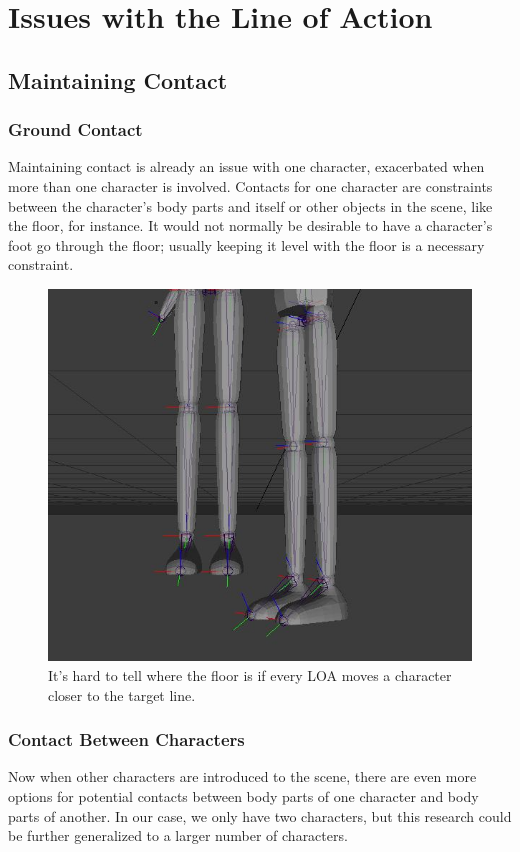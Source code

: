 \chapter{Issues with the Line of Action}\label{chap:issues}

\section{Maintaining Contact}
\subsection{Ground Contact}
Maintaining contact is already an issue with one character, exacerbated when more than one character is involved. Contacts for one character are constraints between the character's body parts and itself or other objects in the scene, like the floor, for instance. It would not normally be desirable to have a character's foot go through the floor; usually keeping it level with the floor is a necessary constraint.

\begin{figure}[!h]
\centering
\includegraphics[scale=0.5]{img/constraint}
\caption{It's hard to tell where the floor is if every LOA moves a character closer to the target line.}
\end{figure}


\subsection{Contact Between Characters}
Now when other characters are introduced to the scene, there are even more options for potential contacts between body parts of one character and body parts of another. In our case, we only have two characters, but this research could be further generalized to a larger number of characters.

